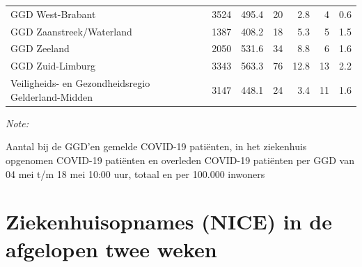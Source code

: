 \documentclass[
  english,
  man,floatsintext]{apa6}
\begin{document}
\begin{table}
\begin{threeparttable}
\begin{tabular}{lrrrrrr}
GGD West-Brabant & 3524 & 495.4 & 20 & 2.8 & 4 & 0.6\\
GGD Zaanstreek/Waterland & 1387 & 408.2 & 18 & 5.3 & 5 & 1.5\\
GGD Zeeland & 2050 & 531.6 & 34 & 8.8 & 6 & 1.6\\
GGD Zuid-Limburg & 3343 & 563.3 & 76 & 12.8 & 13 & 2.2\\
Veiligheids- en Gezondheidsregio Gelderland-Midden & 3147 & 448.1 & 24 & 3.4 & 11 & 1.6\\
\bottomrule
\end{tabular}
\begin{tablenotes}
\item \textit{Note: } 
\item Aantal bij de GGD’en gemelde COVID-19 patiënten, in het ziekenhuis opgenomen COVID-19 patiënten en overleden COVID-19 patiënten per GGD van 04 mei t/m 18 mei 10:00 uur, totaal en per 100.000 inwoners
\end{tablenotes}
\end{threeparttable}
\endgroup{}
\end{table}

\newpage

\hypertarget{ziekenhuisopnames-nice-in-de-afgelopen-twee-weken}{%
\section{Ziekenhuisopnames (NICE) in de afgelopen twee weken}\label{ziekenhuisopnames-nice-in-de-afgelopen-twee-weken}}
\end{document}
